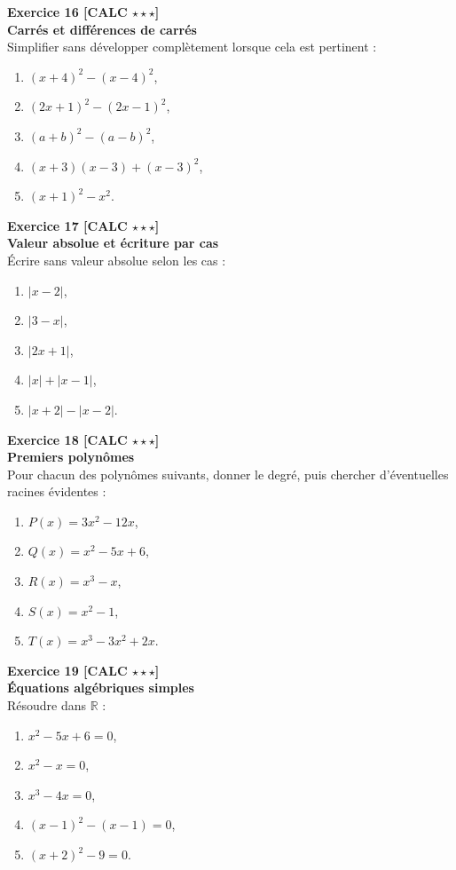 \documentclass[11pt,a4paper]{article}
\begin{document}
\textbf{Exercice 16 [CALC $\star\star\star$]}\\
\textbf{Carrés et différences de carrés}\\
Simplifier sans développer complètement lorsque cela est pertinent :
\begin{enumerate}[label=\alph*)]
    \item $(x+4)^2-(x-4)^2$,
    \item $(2x+1)^2-(2x-1)^2$,
    \item $(a+b)^2-(a-b)^2$,
    \item $(x+3)(x-3)+(x-3)^2$,
    \item $(x+1)^2-x^2$.
\end{enumerate}

\textbf{Exercice 17 [CALC $\star\star\star$]}\\
\textbf{Valeur absolue et écriture par cas}\\
Écrire sans valeur absolue selon les cas :
\begin{enumerate}[label=\alph*)]
    \item $|x-2|$,
    \item $|3-x|$,
    \item $|2x+1|$,
    \item $|x|+|x-1|$,
    \item $|x+2|-|x-2|$.
\end{enumerate}

\textbf{Exercice 18 [CALC $\star\star\star$]}\\
\textbf{Premiers polynômes}\\
Pour chacun des polynômes suivants, donner le degré, puis chercher d’éventuelles racines évidentes :
\begin{enumerate}[label=\alph*)]
    \item $P(x)=3x^2-12x$,
    \item $Q(x)=x^2-5x+6$,
    \item $R(x)=x^3-x$,
    \item $S(x)=x^2-1$,
    \item $T(x)=x^3-3x^2+2x$.
\end{enumerate}

\textbf{Exercice 19 [CALC $\star\star\star$]}\\
\textbf{Équations algébriques simples}\\
Résoudre dans $\mathbb{R}$ :
\begin{enumerate}[label=\alph*)]
    \item $x^2-5x+6=0$,
    \item $x^2-x=0$,
    \item $x^3-4x=0$,
    \item $(x-1)^2-(x-1)=0$,
    \item $(x+2)^2-9=0$.
\end{enumerate}
\end{document}
